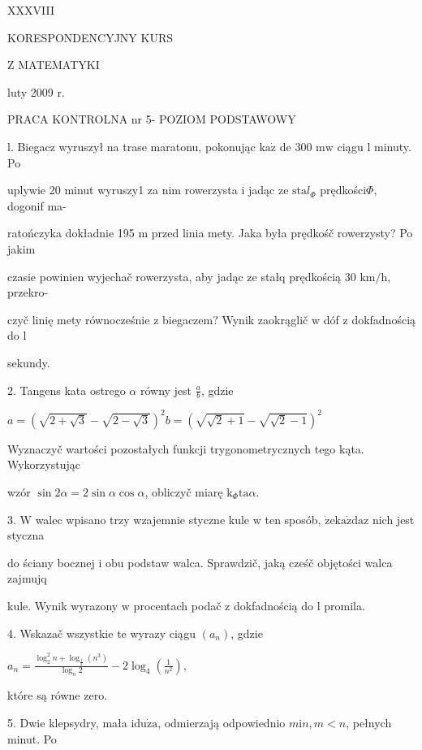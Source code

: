\documentclass[a4paper,12pt]{article}
\begin{document}
XXXVIII

KORESPONDENCYJNY KURS

Z MATEMATYKI

luty 2009 r.

PRACA KONTROLNA nr 5- POZIOM PODSTAWOWY

l. Biegacz wyruszył na trase maratonu, pokonując $\mathrm{k}\mathrm{a}\dot{\mathrm{z}}$ de 300 $\mathrm{m} \mathrm{w}$ ciągu l minuty. Po

uplywie 20 minut wyruszy1 za nim rowerzysta $\mathrm{i}$ jadąc ze $\mathrm{s}\mathrm{t}\mathrm{a}l_{\Phi}$ prędkości$\Phi$, dogonif ma-

ratończyka dokładnie 195 $\mathrm{m}$ przed linia mety. Jaka była prędkośč rowerzysty? Po jakim

czasie powinien wyjechač rowerzysta, aby jadąc ze stałq prędkością 30 $\mathrm{k}\mathrm{m}/\mathrm{h}$, przekro-

czyč linię mety równocześnie $\mathrm{z}$ biegaczem? Wynik zaokrąglič $\mathrm{w}$ dóf $\mathrm{z}$ dokfadnością do l

sekundy.

2. Tangens kata ostrego $\alpha$ równy jest $\displaystyle \frac{a}{b}$, gdzie

$a=(\sqrt{2+\sqrt{3}}-\sqrt{2-\sqrt{3}})^{2}b=(\sqrt{\sqrt{2}+1}-\sqrt{\sqrt{2}-1})^{2}$

Wyznaczyč wartości pozostałych funkcji trygonometrycznych tego kąta. Wykorzystując

wzór $\sin 2\alpha=2\sin\alpha\cos\alpha$, obliczyč miarę $\mathrm{k}_{\Phi}\mathrm{t}\mathrm{a}\alpha.$

3. $\mathrm{W}$ walec wpisano trzy wzajemnie styczne kule $\mathrm{w}$ ten sposób, $\dot{\mathrm{z}}\mathrm{e}\mathrm{k}\mathrm{a}\dot{\mathrm{z}}\mathrm{d}\mathrm{a}\mathrm{z}$ nich jest styczna

do ściany bocznej $\mathrm{i}$ obu podstaw walca. Sprawdzič, jaką cześč objętości walca zajmujq

kule. Wynik wyrazony $\mathrm{w}$ procentach podač $\mathrm{z}$ dokfadnością do l promila.

4. Wskazač wszystkie $\mathrm{t}\mathrm{e}$ wyrazy ciągu $(a_{n})$, gdzie

$a_{n}=\displaystyle \frac{\log_{2}^{2}n+\log_{\frac{1}{2}}(n^{3})}{\log_{n}2}-2\log_{4}(\frac{1}{n^{2}}),$

które są równe zero.

5. Dwie klepsydry, mała $\mathrm{i}\mathrm{d}\mathrm{u}\dot{\mathrm{z}}\mathrm{a}$, odmierzają odpowiednio $m\mathrm{i}n, m<n$, pełnych minut. Po
\end{document}
